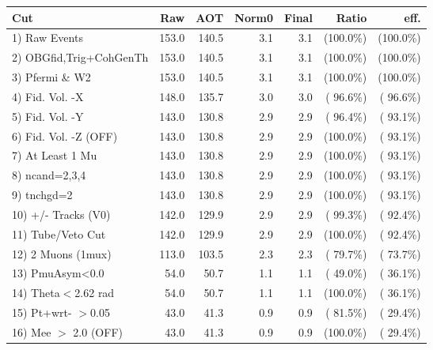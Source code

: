  \begin{table}[h!]\centering
 \begin{tabular}{||l||r|r|r|r|r|r||}
 \hline
 \hline
 Cut & Raw & AOT & Norm0 & Final & Ratio & eff.       \\
 \hline
  1) Raw Events           &        153.0 &        140.5 &          3.1 &          3.1 & (100.0\%) & (100.0\%) \\
  2) OBGfid,Trig+CohGenTh &        153.0 &        140.5 &          3.1 &          3.1 & (100.0\%) & (100.0\%) \\
  3) Pfermi \& W2         &        153.0 &        140.5 &          3.1 &          3.1 & (100.0\%) & (100.0\%) \\
  4) Fid. Vol. -X         &        148.0 &        135.7 &          3.0 &          3.0 & ( 96.6\%) & ( 96.6\%) \\
  5) Fid. Vol. -Y         &        143.0 &        130.8 &          2.9 &          2.9 & ( 96.4\%) & ( 93.1\%) \\
  6) Fid. Vol. -Z (OFF)   &        143.0 &        130.8 &          2.9 &          2.9 & (100.0\%) & ( 93.1\%) \\
  7) At Least 1 Mu        &        143.0 &        130.8 &          2.9 &          2.9 & (100.0\%) & ( 93.1\%) \\
  8) ncand=2,3,4          &        143.0 &        130.8 &          2.9 &          2.9 & (100.0\%) & ( 93.1\%) \\
  9) tnchgd=2             &        143.0 &        130.8 &          2.9 &          2.9 & (100.0\%) & ( 93.1\%) \\
 10) +/- Tracks (V0)      &        142.0 &        129.9 &          2.9 &          2.9 & ( 99.3\%) & ( 92.4\%) \\
 11) Tube/Veto Cut        &        142.0 &        129.9 &          2.9 &          2.9 & (100.0\%) & ( 92.4\%) \\
 12) 2 Muons (1mux)       &        113.0 &        103.5 &          2.3 &          2.3 & ( 79.7\%) & ( 73.7\%) \\
 13) PmuAsym<0.0          &         54.0 &         50.7 &          1.1 &          1.1 & ( 49.0\%) & ( 36.1\%) \\
 14) Theta$<$2.62 rad     &         54.0 &         50.7 &          1.1 &          1.1 & (100.0\%) & ( 36.1\%) \\
 15) Pt+wrt- $>$0.05      &         43.0 &         41.3 &          0.9 &          0.9 & ( 81.5\%) & ( 29.4\%) \\
 16) Mee $>$ 2.0  (OFF)   &         43.0 &         41.3 &          0.9 &          0.9 & (100.0\%) & ( 29.4\%) \\

\end{tabular}
\end{table}
